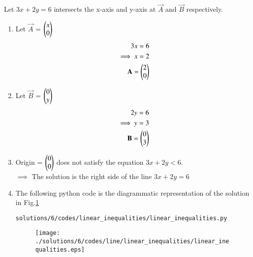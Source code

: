 %
 Let $3x+2y=6$ intersects the x-axis and y-axis at $\vec{A}$ and $\vec{B}$ respectively.
\begin{enumerate}
\item Let $\vec{A}$ = $\begin{pmatrix}x\\0\end{pmatrix}$
\begin{align}
3x = 6
\\
\implies x=2
\\
\mathbf{A} = \begin{pmatrix}2\\0\end{pmatrix}
\end{align}
\item Let $\vec{B}$ = $\begin{pmatrix}0\\y\end{pmatrix}$ 
\begin{align}
2y = 6
\\
\implies y=3
\\
\mathbf{B} = \begin{pmatrix}0\\3\end{pmatrix}
\end{align}
\item Origin = $\begin{pmatrix}0\\0\end{pmatrix}$ does not satisfy the equation $3x+2y<6$. \\
$\implies$ The solution is the right side of the line $3x+2y=6$ \\

\item The following python code is the diagrammatic representation of the solution in Fig.\ref{fig:3.11.6_line_ineq}
\begin{lstlisting}
solutions/6/codes/linear_inequalities/linear_inequalities.py
\end{lstlisting}

\begin{figure}[!ht]
\texttt{[image: ./solutions/6/codes/line/linear\_inequalities/linear\_inequalities.eps]}
\caption{}
\label{fig:3.11.6_line_ineq}
\end{figure} 

\end{enumerate}
 

 
 
